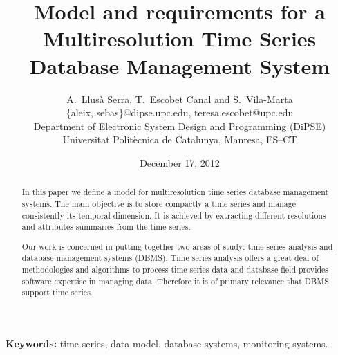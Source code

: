 \documentclass{scrartcl}
\title{%
  Model and requirements for a Multiresolution Time Series
  Database Management System }
\author
{
  {%
    A.\ Llusà Serra,
    T.\ Escobet Canal
    and S.\ Vila-Marta
  }\\
  {\large \{aleix, sebas\}@dipse.upc.edu, teresa.escobet@upc.edu}\\
  {\large Department of Electronic System Design and Programming (DiPSE)}\\
  {\large Universitat Politècnica de Catalunya, Manresa, ES--CT}
}
\date{December 17, 2012}
\begin{document}
\maketitle


\begin{abstract}
In this paper we define a model for multiresolution time series
database management systems. The main objective is to store compactly
a time series and manage consistently its temporal dimension. It is
achieved by extracting different resolutions and attributes summaries
from the time series.  

Our work is concerned in putting together two areas of study: time
series analysis and database management systems (DBMS). Time series analysis
offers a great deal of methodologies and algorithms to process time
series data and database field provides software expertise in managing
data. Therefore it is of primary relevance that DBMS support time series.
\end{abstract}

{\bfseries Keywords:} time series, data model, database systems,
monitoring systems.












\printbibliography{}
\end{document}
